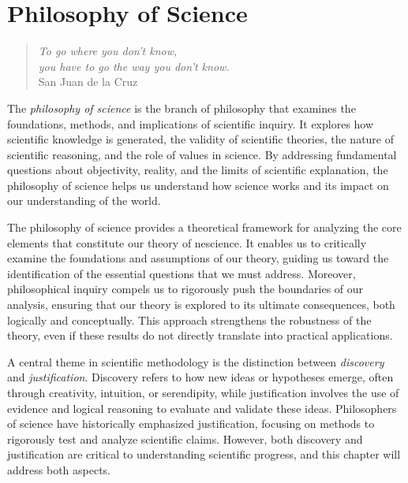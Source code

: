 %
%


\chapter{Philosophy of Science}
\label{chap:Philosophy}

\begin{quote}
\begin{flushright}
\emph{To go where you don't know, \\
you have to go the way you don't know.} \\
San Juan de la Cruz 
\end{flushright}
\end{quote}
\bigskip

The \emph{philosophy of science} is the branch of philosophy that examines the foundations, methods, and implications of scientific inquiry. It explores how scientific knowledge is generated, the validity of scientific theories, the nature of scientific reasoning, and the role of values in science. By addressing fundamental questions about objectivity, reality, and the limits of scientific explanation, the philosophy of science helps us understand how science works and its impact on our understanding of the world.

The philosophy of science provides a theoretical framework for analyzing the core elements that constitute our theory of nescience. It enables us to critically examine the foundations and assumptions of our theory, guiding us toward the identification of the essential questions that we must address. Moreover, philosophical inquiry compels us to rigorously push the boundaries of our analysis, ensuring that our theory is explored to its ultimate consequences, both logically and conceptually. This approach strengthens the robustness of the theory, even if these results do not directly translate into practical applications.

A central theme in scientific methodology is the distinction between \emph{discovery} and \emph{justification}. Discovery refers to how new ideas or hypotheses emerge, often through creativity, intuition, or serendipity, while justification involves the use of evidence and logical reasoning to evaluate and validate these ideas. Philosophers of science have historically emphasized justification, focusing on methods to rigorously test and analyze scientific claims. However, both discovery and justification are critical to understanding scientific progress, and this chapter will address both aspects.


